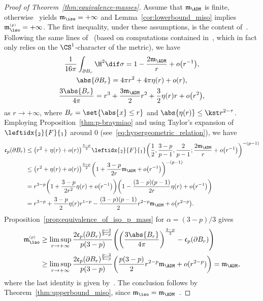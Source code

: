 \documentclass[10pt,a4paper]{amsart}
\numberwithin{equation}{section}
\renewcommand{\ncapa}{\mathfrak{c}}
\newcommand{\ma}{\mathfrak{m}}
\newcommand{\tp}[1][p]{{\text{\tiny$(#1)$}}}
\begin{document}
\begin{proof}[Proof of Theorem~\ref{thm:equivalence-masses}] Assume that $\ma_{\ADM}$ is finite, otherwise~\cite[Theorem 4.13]{benatti_isoperimetricriemannianpenroseinequality_2022} yields ${\ma_{\iso}=+\infty}$ and Lemma~\ref{cor:lowerbound_miso} implies $\ma^{\tp}_{\iso}=+\infty$. The first inequality, under these assumptions, is the content of~\cite[Theorem 4.13]{benatti_isoperimetricriemannianpenroseinequality_2022}. Following the same lines of~\cite[Proposition 14]{jauregui_admmasscapacityvolumedeficit_2020} (based on computations contained in~\cite{fan_largespheresmallspherelimitsbrownyork_2009}, which in fact only relies on the $\CS^1$-character of the metric), we have
\begin{gather*}
 \frac{1}{16 \pi} \int_{\partial B_r} \H^2 \dif \sigma =1- \frac{2 \ma_{\ADM}}{r} + o\big(r^{-1}\big),\\
 \abs{ \partial B_r} = 4 \pi r^2 + 4 \pi \eta(r) + o(r),\\
 \frac{3 \abs{ B_r}}{4 \pi } = r^3 +\frac{3 \ma_{\ADM}}{2}r^2 + \frac{3 }{2} \eta(r) r + o\big(r^2\big) ,
\end{gather*}
as $r \to +\infty$, where $B_r= \set{ \abs{x} \leq r}$ and $\abs{\eta(r)}\leq \kst r^{2-\tau}$. Employing Proposition~\ref{thm:p-braymiao} and using Taylor's expansion of $\leftidx{_2}{F}{_1}$ around $0$ (see~\eqref{eq:hypergeometric_relation}), we have
\begin{align*}
\ncapa_p(\partial B_r) &{}\leq \big( r^2 + \eta(r) + o(r)\big)^{\frac{3-p}{2}}\leftidx{_2}{F}{_1}\bigg(\frac{1}{2}, \frac{3-p}{p-1}, \frac{2}{p-1};\frac{ 2\ma_{\ADM}}{r}+o\big(r^{-1}\big)\bigg)^{-(p-1)} \\
&{}\leq \big( r^2 + \eta(r) + o(r)\big)^{\frac{3-p}{2}}\bigg(1+ \frac{3-p}{2r} \ma_{\ADM} +o\big(r^{-1}\big) \bigg)^{-(p-1)} \\
&{} =r^{3-p}\bigg( 1+ \frac{3-p}{2r^2}\eta(r)+ o\big(r^{-1}\big)\bigg) \bigg( 1- \frac{(3-p)(p-1)}{2r}\eta(r)+ o\big(r^{-1}\big)\bigg) \\
&{} = r^{3-p}+ \frac{3-p}{2} \eta(r)r^{1-p}- \frac{(3-p)(p-1)}{2} r^{2-p} \ma_{\ADM} + o\big(r^{2-p}\big).
\end{align*}
Proposition~\ref{prop:equivalence_of_iso_p_mass} for $\alpha= (3-p)/3$ gives
\begin{align*}
 \ma^{\tp}_{\iso}& {}\geq \limsup_{r \to +\infty}\frac{2\ncapa_p(\partial B_r)^{\frac{p-2}{3-p}}}{p(3-p)}\Bigg( \bigg( \frac{3 \abs{ B_r}}{4 \pi }\bigg)^{\frac{3-p}{3}} - \ncapa_p(\partial B_r)\Bigg)\\
 & {}\geq \limsup_{r \to +\infty}\frac{2\ncapa_p(\partial B_r)^{\frac{p-2}{3-p}}}{p(3-p)} \bigg(\frac{p(3-p)}{2}r^{2-p}\ma_{\ADM}+ o (r^{2-p}) \bigg)= \ma_{\ADM},
\end{align*}
where the last identity is given by~\cite[Lemma 2.21]{benatti_asymptoticbehaviourcapacitarypotentials_2022}. The conclusion follows by Theorem~\ref{thm:upperbound_miso}, since $\ma_{\iso}= \ma_{\ADM}$~\cite[Theorem 4.13]{benatti_isoperimetricriemannianpenroseinequality_2022}. \end{proof}
\end{document}

